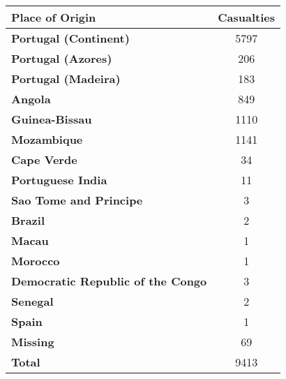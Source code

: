 
\begin{tabular}{>{}lc}
\toprule
\textbf{Place of Origin} & \textbf{Casualties}\\
\midrule
\textbf{Portugal (Continent)} & 5797\\
\textbf{Portugal (Azores)} & 206\\
\textbf{Portugal (Madeira)} & 183\\
\textbf{Angola} & 849\\
\textbf{Guinea-Bissau} & 1110\\
\textbf{Mozambique} & 1141\\
\textbf{Cape Verde} & 34\\
\textbf{Portuguese India} & 11\\
\textbf{Sao Tome and Principe} & 3\\
\textbf{Brazil} & 2\\
\textbf{Macau} & 1\\
\textbf{Morocco} & 1\\
\textbf{Democratic Republic of the Congo} & 3\\
\textbf{Senegal} & 2\\
\textbf{Spain} & 1\\
\textbf{Missing} & 69\\
\midrule
\textbf{Total} & 9413\\
\bottomrule
\end{tabular}
